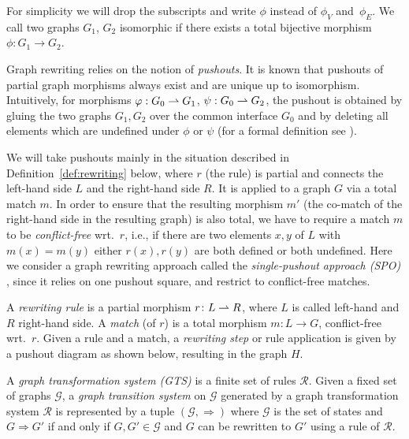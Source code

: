 \documentclass{llncs}
\newcommand*{\catDiagramScale}{0.85}
\begin{document}
For simplicity we will drop the subscripts and write $\phi$ instead of
$\phi_V$ and~$\phi_E$.  We call two graphs $G_1$, $G_2$ isomorphic if
there exists a total bijective morphism $\phi : G_1 \to G_2$.

Graph rewriting relies on the notion of \emph{pushouts}.  It is known that
pushouts of partial graph morphisms always exist and are unique up to
isomorphism.  Intuitively, for morphisms $\varphi : G_0 \rightharpoonup G_1$, $\psi
: G_0 \rightharpoonup G_2$, the pushout is obtained by gluing the two graphs
$G_1,G_2$ over the common interface $G_0$ and by deleting all elements
which are undefined under $\phi$ or $\psi$ (for a formal definition see 
).

We will take pushouts mainly in the situation described in
Definition~\ref{def:rewriting} below, where $r$ (the rule) is partial
and connects the left-hand side $L$ and the right-hand side $R$. It is
applied to a graph $G$ via a total match $m$. In order to ensure that
the resulting morphism $m'$ (the co-match of the right-hand side in
the resulting graph) is also total, we have to require a match $m$ to be
\emph{conflict-free} wrt.\ $r$, i.e., if there are two elements $x,y$
of $L$ with $m(x)=m(y)$ either $r(x),r(y)$ are both defined or both
undefined.
Here we consider a graph rewriting approach called the
\emph{single-pushout approach (SPO)} \cite{ehklrwc:algebraic-approaches-II},
since it relies on one pushout square, and restrict to conflict-free matches.

\begin{definition}\label{def:rewriting}\label{def:gts}
  A \emph{rewriting rule} is a partial morphism $r\colon L\rightharpoonup R$,
  where $L$ is called left-hand and $R$ right-hand side.  A
  \emph{match} (of $r$) is a total morphism $m\colon L\to G$,
  conflict-free wrt.\ $r$.  Given a rule and a match, a
  \emph{rewriting step} or rule application is given by a pushout
  diagram as shown below, resulting in the graph $H$.

\noindent
\parbox{0.8\textwidth}{%
  A \emph{graph transformation system (GTS)} is a finite set of rules
  $\mathcal{R}$.  Given a fixed set of graphs $\mathcal{G}$, a
  \emph{graph transition system} on $\mathcal{G}$ generated by a graph
  transformation system $\mathcal{R}$ is represented by a tuple
  $(\mathcal{G},\Rightarrow)$ where $\mathcal{G}$ is the set of states
  and $G \Rightarrow G'$ if and only if $G,G' \in \mathcal{G}$ and $G$
  can be rewritten to $G'$ using a rule of $\mathcal{R}$.}
\parbox{0.2\textwidth}{%
\begin{center}
  \img{\catDiagramScale}{diagrams/rewriting}
\end{center}}
\end{definition}
\end{document}
